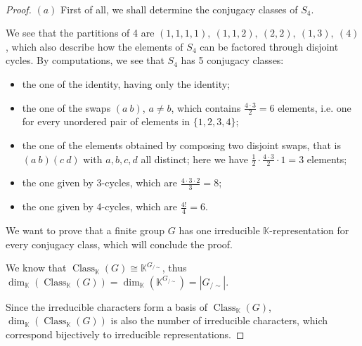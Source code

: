 \documentclass{article}
\newcommand{\numberset}{\mathbb}
\newcommand{\K}{\numberset{K}}
\newcommand{\exercise}[1]{\noindent {\bf Exercise #1}}
\DeclareMathOperator{\Class}{Class}
\begin{document}
~\\
\exercise{7.8}

\begin{proof}
    $(a)$ First of all, we shall determine the conjugacy classes of $S_4$.

    We see that the partitions of 4 are $(1,1,1,1),\ (1,1,2),\ (2,2),\ (1,3),\
    (4)$, which also describe how the elements of $S_4$ can be factored through
    disjoint cycles. By computations, we see that $S_4$ has 5 conjugacy classes:
    \begin{itemize}
        \item the one of the identity, having only the identity;
        \item the one of the swaps $(a\ b)$, $a\neq b$, which contains
            $\frac{4\cdot 3}{2}=6$ elements, i.e. one for every unordered pair
            of elements in $\{1,2,3,4\}$;
        \item the one of the elements obtained by composing two disjoint swaps,
            that is $(a\ b)(c\ d)$ with $a,b,c,d$ all distinct; here we have
            $\frac{1}{2}\cdot\frac{4\cdot 3}{2}\cdot 1=3$ elements;
        \item the one given by 3-cycles, which are
            $\frac{4\cdot 3\cdot 2}{3}=8$;
        \item the one given by 4-cycles, which are $\frac{4!}{4}=6$.
    \end{itemize}

    We want to prove that a finite group $G$ has one irreducible
    $\K$-representation for every conjugacy class, which will conclude the proof.

    We know that $\Class_{\K}(G)\cong\K^{G_{/\sim}}$, thus
    $\dim_{\K}(\Class_{\K}(G))=\dim_{\K}(\K^{G_{/\sim}})=|G_{/\sim}|$.

    Since the irreducible characters form a basis of $\Class_{\K}(G)$,
    $\dim_\K(\Class_{\K}(G))$ is also the number of irreducible characters,
    which correspond bijectively to irreducible representations.
\end{proof}
\end{document}
